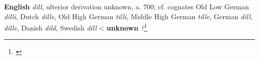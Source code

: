 \begin{etymology}\label{ety:dill}
\textbf{English} \textit{dill}, ulterior derivation unknown, a. 700; cf. cognates  Old Low German \textit{dilli}, Dutch \textit{dille}, Old High German \textit{tilli}, Middle High German \textit{tille}, German \textit{dill, dille}, Danish \textit{dild}, Swedish \textit{dill} 
< \textbf{unknown} \textit{?}\footnote{\textcite[s.v. dill]{oed}}
\end{etymology}